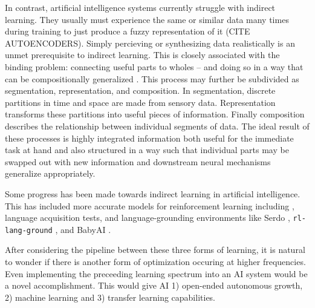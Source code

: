 In contrast, artificial intelligence systems currently struggle with indirect learning. They usually must experience the same or similar data many times during training to just produce a fuzzy representation of it (CITE AUTOENCODERS). Simply percieving or synthesizing data realistically is an unmet prerequisite to indirect learning. This is closely associated with the binding problem: connecting useful parts to wholes -- and doing so in a way that can be compositionally generalized \cite{Klaus2020}. This process may further be subdivided as segmentation, representation, and composition. In segmentation, discrete partitions in time and space are made from sensory data. Representation transforms these partitions into useful pieces of information. Finally composition describes the relationship between individual segments of data. The ideal result of these processes is highly integrated information both useful for the immediate task at hand and also structured in a way such that individual parts may be swapped out with new information and downstream neural mechanisms generalize appropriately.

Some progress has been made towards indirect learning in artificial intelligence. This has included more accurate models for reinforcement learning including \cite{hafner2020dreamerv2,Guan2019,ha2018worldmodels}, language acquisition tests\cite{Mondol2020}, and language-grounding environments like Serdo \cite{Pothula2020}, \verb|rl-lang-ground| \cite{8658389}, and BabyAI \cite{hui2020babyai,babyai_iclr19}. 

After considering the pipeline between these three forms of learning, it is natural to wonder if there is another form of optimization occuring at higher frequencies. Even implementing the preceeding learning spectrum into an AI system would be a novel accomplishment. This would give AI 1) open-ended autonomous growth, 2) machine learning   and 3) transfer learning capabilities. 
